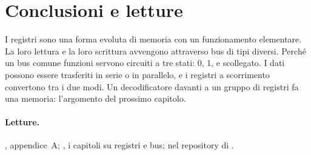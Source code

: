\section{Conclusioni e letture}

I registri sono una forma evoluta di memoria con un funzionamento elementare.
La loro lettura e la loro scrittura avvengono attraverso bus di tipi diversi.
Perché un bus comune funzioni servono circuiti a tre stati: 0, 1, e scollegato.
I dati possono essere trasferiti in serie o in parallelo, e i registri a
scorrimento convertono tra i due modi. Un decodificatore davanti a un gruppo di
registri fa una memoria: l'argomento del prossimo capitolo.

\paragraph{Letture.} \citet{patterson2020}, appendice~A; \citet{bucci2017}, i
capitoli su registri e bus;  nel repository
di \prg.
